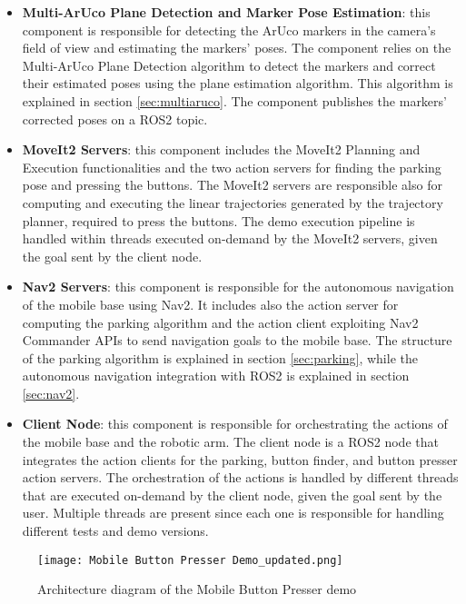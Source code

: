 \begin{itemize}
    \item \textbf{Multi-ArUco Plane Detection and Marker Pose Estimation}: this component is responsible for detecting
    the ArUco markers in the camera's field of view and estimating the markers' poses. The component relies on 
    the Multi-ArUco Plane Detection algorithm to detect the markers and correct their estimated poses using the
    plane estimation algorithm. This algorithm is explained in section \ref{sec:multiaruco}.
    The component publishes the markers' corrected poses on a ROS2 topic.
    \item \textbf{MoveIt2 Servers}: this component includes the MoveIt2 Planning and Execution functionalities
    and the two action servers for finding the parking pose and pressing the buttons. The MoveIt2 servers
    are responsible also for computing and executing the linear trajectories generated by the trajectory planner,
    required to press the buttons. The demo execution pipeline is handled within threads executed 
    on-demand by the MoveIt2 servers, given the goal sent by the client node.
    \item \textbf{Nav2 Servers}: this component is responsible for the autonomous navigation of the mobile base
    using Nav2. It includes also the action server for computing the parking algorithm and the action client
    exploiting Nav2 Commander APIs to send navigation goals to the mobile base. The structure of the parking algorithm
    is explained in section \ref{sec:parking}, while the autonomous navigation integration with ROS2 is explained
    in section \ref{sec:nav2}.
    \item \textbf{Client Node}: this component is responsible for orchestrating the actions of the mobile base
    and the robotic arm. The client node is a ROS2 node that integrates the action clients for the parking, button finder,
    and button presser action servers. The orchestration of the actions is handled by different threads that
    are executed on-demand by the client node, given the goal sent by the user. Multiple threads are present
    since each one is responsible for handling different tests and demo versions.
\end{itemize}

\begin{figure}[t]
    \centering
    \texttt{[image: Mobile Button Presser Demo\_updated.png]}
    \caption{Architecture diagram of the Mobile Button Presser demo}
    \label{fig:arch1}
\end{figure}


